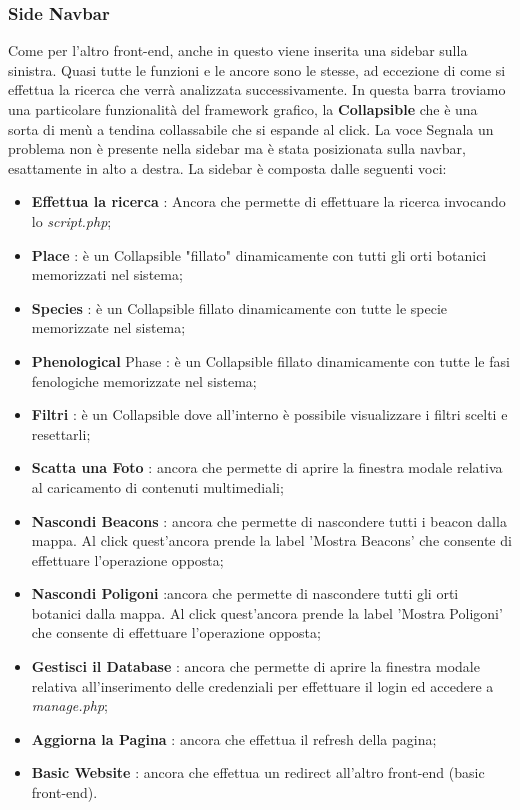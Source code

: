 \subsubsection{Side Navbar}
Come per l'altro front-end, anche in questo viene inserita una sidebar sulla sinistra. Quasi tutte le funzioni e le ancore sono le stesse, ad eccezione di come si effettua la ricerca che verrà analizzata successivamente.  \newline
In questa barra troviamo una particolare funzionalità del framework grafico, la \textbf{Collapsible} che è una sorta di menù a tendina collassabile che si espande al click.
La voce Segnala un problema non è presente nella sidebar ma è stata posizionata sulla navbar, esattamente in alto a destra. \newline
La sidebar è composta dalle seguenti voci:
\begin{itemize}
\item \textbf{Effettua la ricerca} : Ancora che permette di effettuare la ricerca invocando lo \textit{script.php};
\item \textbf{Place} : è un Collapsible "fillato" dinamicamente con tutti gli orti botanici memorizzati nel sistema;
\item \textbf{Species} : è un Collapsible fillato dinamicamente con tutte le specie memorizzate nel sistema;
\item \textbf{Phenological} Phase : è un Collapsible fillato dinamicamente con tutte le fasi fenologiche memorizzate nel sistema;
\item \textbf{Filtri} : è un Collapsible dove all'interno è possibile visualizzare i filtri scelti e resettarli;
\item \textbf{Scatta una Foto} : ancora che permette di aprire la finestra modale relativa al caricamento di contenuti multimediali;
\item \textbf{Nascondi Beacons }: ancora che permette di nascondere tutti i beacon dalla mappa. Al click quest'ancora prende la label 'Mostra Beacons' che consente di effettuare l'operazione opposta;
\item \textbf{Nascondi Poligoni} :ancora che permette di nascondere tutti gli orti botanici dalla mappa. Al click quest'ancora prende la label 'Mostra Poligoni' che consente di effettuare l'operazione opposta;
\item \textbf{Gestisci il Database} : ancora che permette di aprire la finestra modale relativa all'inserimento delle credenziali per effettuare il login ed accedere a \textit{manage.php};
\item \textbf{Aggiorna la Pagina} : ancora che effettua il refresh della pagina;
\item \textbf{Basic Website} : ancora che effettua un redirect all'altro front-end (basic front-end).
\end{itemize}

